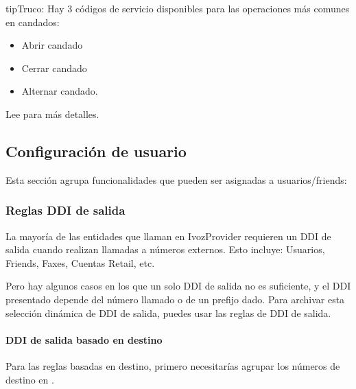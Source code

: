 \documentclass[letterpaper,10pt,spanish]{sphinxmanual}
\begin{document}
\begin{notice}{tip}{Truco:}
Hay 3 códigos de servicio disponibles para las operaciones más comunes en candados:
\begin{itemize}
\item {} 
Abrir candado

\item {} 
Cerrar candado

\item {} 
Alternar candado.

\end{itemize}

Lee {\hyperref[administration_portal/client/vpbx/services:services]{}} para más detalles.
\end{notice}


\subsection{Configuración de usuario}
\label{administration_portal/client/vpbx/user_configuration/index:user-configuration}\label{administration_portal/client/vpbx/user_configuration/index::doc}
Esta sección agrupa funcionalidades que pueden ser asignadas a usuarios/friends:


\subsubsection{Reglas DDI de salida}
\label{administration_portal/client/vpbx/user_configuration/outgoing_ddi_rules:outgoing-ddi-rules}\label{administration_portal/client/vpbx/user_configuration/outgoing_ddi_rules:outgoingddi-rules}\label{administration_portal/client/vpbx/user_configuration/outgoing_ddi_rules::doc}
La mayoría de las entidades que llaman en IvozProvider requieren un DDI de salida cuando realizan llamadas a números externos. Esto incluye: Usuarios, Friends, Faxes, Cuentas Retail, etc.

Pero hay algunos casos en los que un solo DDI de salida no es suficiente, y el DDI presentado depende del número llamado o de un prefijo dado. Para archivar esta selección dinámica de DDI de salida, puedes usar las reglas de DDI de salida.


\paragraph{DDI de salida basado en destino}
\label{administration_portal/client/vpbx/user_configuration/outgoing_ddi_rules:outgoing-ddi-based-on-destination}
Para las reglas basadas en destino, primero necesitarías agrupar los números de destino en {\hyperref[administration_portal/client/vpbx/routing_tools/match_lists:match\string-lists]{}}.
\end{document}
